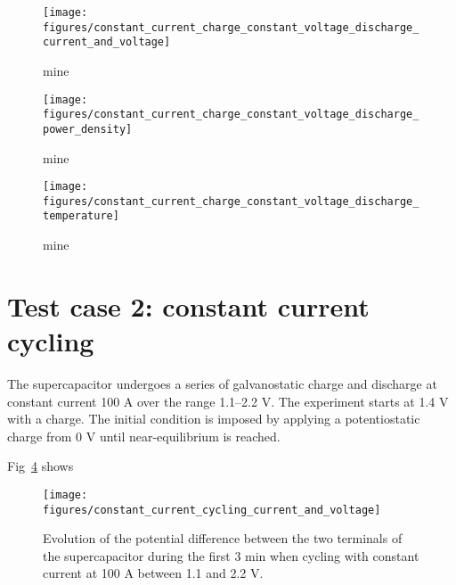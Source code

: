 \documentclass[10pt, oneside]{article}   	%
\begin{document}
\begin{figure}[h!]
    \centering
    \texttt{[image: figures/constant\_current\_charge\_constant\_voltage\_discharge\_current\_and\_voltage]}
    \caption{mine}
    \label{fig:constant_current_charge_constant_voltage_discharge_current_and_voltage}
\end{figure}

\begin{figure}[h!]
    \centering
    \texttt{[image: figures/constant\_current\_charge\_constant\_voltage\_discharge\_power\_density]}
    \caption{mine}
    \label{fig:constant_current_charge_constant_voltage_discharge_current_and_voltage}
\end{figure}

\begin{figure}[h!]
    \centering
    \texttt{[image: figures/constant\_current\_charge\_constant\_voltage\_discharge\_temperature]}
    \caption{mine}
    \label{fig:constant_current_charge_constant_voltage_discharge_temperature}
\end{figure}



\section{Test case 2: constant current cycling}
The supercapacitor undergoes a series of galvanostatic charge and discharge at
constant current 100 A over the range 1.1--2.2 V.
The experiment starts at 1.4 V with a charge.  The initial condition is
imposed by applying a potentiostatic charge from 0 V until near-equilibrium
is reached.

Fig~\ref{fig:constant_current_cycling_current_and_voltage} shows

\begin{figure}[h!]
    \centering
    \texttt{[image: figures/constant\_current\_cycling\_current\_and\_voltage]}
    \caption{Evolution of the potential difference between the two terminals
of the supercapacitor during the first 3 min when cycling with constant
current at 100 A between 1.1 and 2.2 V.
    }
    \label{fig:constant_current_cycling_current_and_voltage}
\end{figure}
\end{document}
